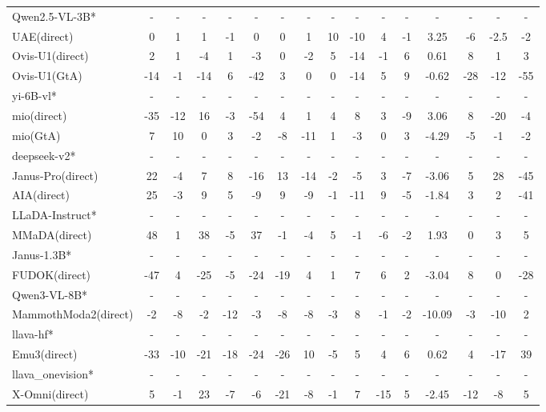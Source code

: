 \documentclass{article}
\providecommand{\rowcolor}[1]{}
\theoremstyle{plain}
\theoremstyle{definition}
\theoremstyle{remark}
\begin{document}
\begin{table}[!htbp]
{\begin{tabular}{@{}lccccccccccccccc@{}}
\rowcolor{gray!12}
Qwen2.5-VL-3B* & - & - & - & - & - & - & - & - & - & - & - & - & - & - & - \\
UAE(direct) & 0 & 1 & 1 & -1 & 0 & 0 & 1 & 10 & -10 & 4 & -1 & 3.25 & -6 & -2.5 & -2 \\
Ovis-U1(direct) & 2 & 1 & -4 & 1 & -3 & 0 & -2 & 5 & -14 & -1 & 6 & 0.61 & 8 & 1 & 3 \\
Ovis-U1(GtA) & -14 & -1 & -14 & 6 & -42 & 3 & 0 & 0 & -14 & 5 & 9 & -0.62 & -28 & -12 & -55 \\
\midrule
\rowcolor{gray!12}
yi-6B-vl* & - & - & - & - & - & - & - & - & - & - & - & - & - & - & - \\
mio(direct) & -35 & -12 & 16 & -3 & -54 & 4 & 1 & 4 & 8 & 3 & -9 & 3.06 & 8 & -20 & -4 \\
mio(GtA) & 7 & 10 & 0 & 3 & -2 & -8 & -11 & 1 & -3 & 0 & 3 & -4.29 & -5 & -1 & -2 \\
\midrule
\rowcolor{gray!12}
deepseek-v2* & - & - & - & - & - & - & - & - & - & - & - & - & - & - & - \\
Janus-Pro(direct) & 22 & -4 & 7 & 8 & -16 & 13 & -14 & -2 & -5 & 3 & -7 & -3.06 & 5 & 28 & -45 \\
AIA(direct) & 25 & -3 & 9 & 5 & -9 & 9 & -9 & -1 & -11 & 9 & -5 & -1.84 & 3 & 2 & -41 \\
\midrule
\rowcolor{gray!12}
LLaDA-Instruct* & - & - & - & - & - & - & - & - & - & - & - & - & - & - & - \\
MMaDA(direct) & 48 & 1 & 38 & -5 & 37 & -1 & -4 & 5 & -1 & -6 & -2 & 1.93 & 0 & 3 & 5 \\
\midrule
\rowcolor{gray!12}
Janus-1.3B* & - & - & - & - & - & - & - & - & - & - & - & - & - & - & - \\
FUDOK(direct) & -47 & 4 & -25 & -5 & -24 & -19 & 4 & 1 & 7 & 6 & 2 & -3.04 & 8 & 0 & -28 \\
\midrule
\rowcolor{gray!12}
Qwen3-VL-8B* & - & - & - & - & - & - & - & - & - & - & - & - & - & - & - \\
MammothModa2(direct) & -2 & -8 & -2 & -12 & -3 & -8 & -8 & -3 & 8 & -1 & -2 & -10.09 & -3 & -10 & 2 \\
\midrule
\rowcolor{gray!12}
llava-hf* & - & - & - & - & - & - & - & - & - & - & - & - & - & - & - \\
Emu3(direct) & -33 & -10 & -21 & -18 & -24 & -26 & 10 & -5 & 5 & 4 & 6 & 0.62 & 4 & -17 & 39 \\
\midrule
\rowcolor{gray!12}
llava\_onevision* & - & - & - & - & - & - & - & - & - & - & - & - & - & - & - \\
X-Omni(direct) & 5 & -1 & 23 & -7 & -6 & -21 & -8 & -1 & 7 & -15 & 5 & -2.45 & -12 & -8 & 5 \\

\end{tabular}}
\end{table}
\end{document}
